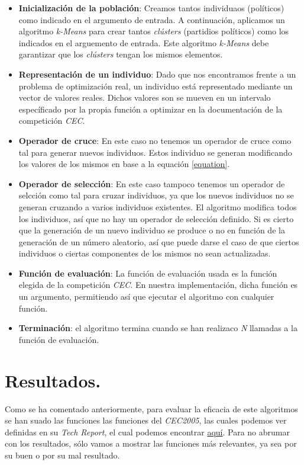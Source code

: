 \documentclass[12pt]{article}
\numberwithin{figure}{section} %
\numberwithin{table}{section} %
\begin{document}
	\begin{itemize}
		\item \textbf{Inicialización de la población}: Creamos tantos individuaos (políticos) como indicado en el argumento de entrada. A continuación, aplicamos un algoritmo \textit{k-Means} para crear tantos \textit{clústers} (partidios políticos) como los indicados en el arguemento de entrada. Este algoritmo \textit{k-Means} debe garantizar que los \textit{clústers} tengan los mismos elementos. 
		\item \textbf{Representación de un individuo}: Dado que nos encontramos frente a un problema de optimización real, un individuo está representado mediante un vector de valores reales. Dichos valores son se mueven en un intervalo específicado por la propia función a optimizar en la documentación de la competición \textit{CEC}.
		\item \textbf{Operador de cruce}: En este caso no tenemos un operador de cruce como tal para generar nuevos individuos. Estos individuo se generan modificando los valores de los mismos en base a la equación \ref{equation}.
		\item \textbf{Operador de selección}: En este caso tampoco tenemos un operador de selcción como tal para cruzar individuos, ya que los nuevos individuos no se generan cruzando a varios individuos existentes. El algoritmo modifica todos los individuos, así que no hay un operador de selección definido. Si es cierto que la generación de un nuevo individuo se produce o no en función de la generación de un número aleatorio, así que puede darse el caso de que ciertos individuos o ciertas componentes de los mismos no sean actualizadas.
		\item \textbf{Función de evaluación}: La función de evaluación usada es la función elegida de la competición \textit{CEC}. En nuestra implementación, dicha función es un argumento, permitiendo así que ejecutar el algoritmo con cualquier función.
		\item \textbf{Terminación}: el algoritmo termina cuando se han realizaco \textit{N} llamadas a la función de evaluación.
	\end{itemize}
	
	\section[Resultados.]{Resultados.}
	
	Como se ha comentado anteriormente, para evaluar la eficacia de este algoritmos se han suado las funciones las funciones del \textit{CEC2005}, las cuales podemos ver definidas en su \textit{Tech Report}, el cual podemos encontrar \href{http://www.cmap.polytechnique.fr/~nikolaus.hansen/Tech-Report-May-30-05.pdf}{aquí}. Para no abrumar con los resultados, sólo vamos a mostrar las funciones más relevantes, ya sea por su buen o por su mal resultado. \\
	
\end{document}
